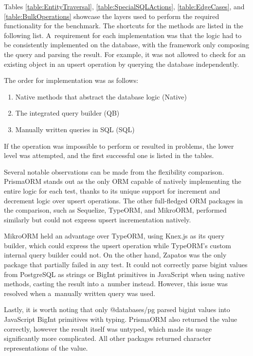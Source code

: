 Tables \ref{table:EntityTraversal}, \ref{table:SpecialSQLActions},
\ref{table:EdgeCases}, and \ref{table:BulkOperations} showcase the layers used
to perform the required functionality for the benchmark. The shortcuts for the
methods are listed in the following list. A~requirement for each implementation
was that the logic had to be consistently implemented on the database, with the
framework only composing the query and parsing the result. For example, it was
not allowed to check for an existing object in an upsert operation by querying
the database independently.

The order for implementation was as follows:
\begin{enumerate}
  \item Native methods that abstract the database logic (Native)
  \item The integrated query builder (QB)
  \item Manually written queries in SQL (SQL)
\end{enumerate}
If the operation was impossible to perform or resulted in problems, the lower
level was attempted, and the first successful one is listed in the tables.

Several notable observations can be made from the flexibility comparison.
PrismaORM stands out as the only ORM capable of natively implementing the entire
logic for each test, thanks to its unique support for increment and decrement
logic over upsert operations. The other full-fledged ORM packages in the
comparison, such as Sequelize, TypeORM, and MikroORM, performed similarly but
could not express upsert incrementation natively.

MikroORM held an advantage over TypeORM, using Knex.js as its query builder,
which could express the upsert operation while TypeORM's custom internal query
builder could not. On the other hand, Zapatos was the only package that
partially failed in any test. It could not correctly parse bigint values from
PostgreSQL as strings or BigInt primitives in JavaScript when using native
methods, casting the result into a~number instead. However, this issue was
resolved when a~manually written query was used.

Lastly, it is worth noting that only @databases/pg parsed bigint values into
JavaScript BigInt primitives with typing. PrismaORM also returned the value
correctly, however the result itself was untyped, which made its usage
significantly more complicated. All other packages returned character
representations of the value. 


